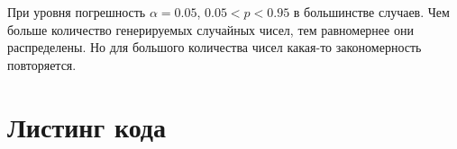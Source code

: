 При уровня погрешность $\alpha = 0.05$, $0.05 < p < 0.95$ в большинстве случаев.
Чем больше количество генерируемых случайных чисел, тем равномернее они распределены.
Но для большого количества чисел какая-то закономерность повторяется.

\pagebreak
\section{Листинг кода}


